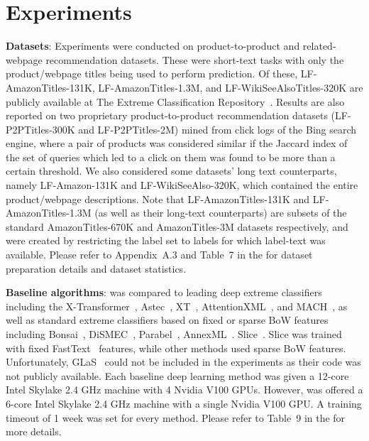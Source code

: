\section{Experiments}
\label{sec:results}




\textbf{Datasets}: Experiments were conducted on product-to-product and related-webpage recommendation datasets. These were short-text tasks with only the product/webpage titles being used to perform prediction. Of these, LF-AmazonTitles-131K, LF-AmazonTitles-1.3M, and LF-WikiSeeAlsoTitles-320K are publicly available at The Extreme Classification Repository~\cite{XMLRepo}. Results are also reported on two proprietary product-to-product recommendation datasets (LF-P2PTitles-300K and LF-P2PTitles-2M) mined from click logs of the Bing search engine, where a pair of products was considered similar if the Jaccard index of the set of queries which led to a click on them was found to be more than a certain threshold. We also considered some datasets' long text counterparts, namely LF-Amazon-131K and LF-WikiSeeAlso-320K, which contained the entire product/webpage descriptions. Note that LF-AmazonTitles-131K and LF-AmazonTitles-1.3M (as well as their long-text counterparts) are subsets of the standard AmazonTitles-670K and AmazonTitles-3M datasets respectively, and were created by restricting the label set to labels for which label-text was available. Please refer to Appendix~A.3 and Table~7 in the \suppl for dataset preparation details and dataset statistics.


\textbf{Baseline algorithms}: \alg was compared to leading deep extreme classifiers including the X-Transformer~\cite{Chang20}, Astec~\cite{Dahiya21}, XT~\cite{Wydmuch18}, AttentionXML~\cite{You18}, and MACH~\cite{Medini2019}, as well as standard extreme classifiers based on fixed or sparse BoW features including Bonsai~\cite{Khandagale19}, DiSMEC~\cite{Babbar17}, Parabel~\cite{Prabhu18b}, AnnexML~\cite{Tagami17}. Slice~\cite{Jain19}. Slice was trained with fixed FastText~\cite{Bojanowski17} features, while other methods used sparse BoW features. Unfortunately, GLaS~\citep{Guo2019} could not be included in the experiments as their code was not publicly available. Each baseline deep learning method was given a 12-core Intel Skylake 2.4 GHz machine with 4 Nvidia V100 GPUs. However, \alg was offered a 6-core Intel Skylake 2.4 GHz machine with a single Nvidia V100 GPU. A training timeout of 1 week was set for every method. Please refer to Table~9 in the \suppl for more details.

